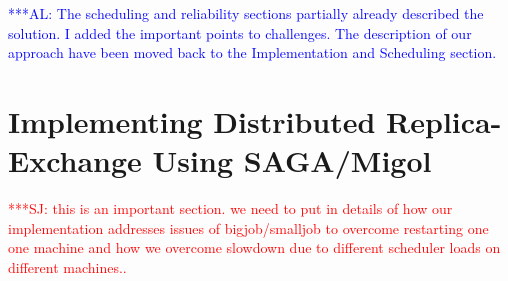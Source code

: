 \documentclass{rspublic}
\newcommand{\alnote}[1]{ {\textcolor{blue} { ***AL: #1 }}}
\newcommand{\jhanote}[1]{ {\textcolor{red} { ***SJ: #1 }}}
\newcommand{\alnote}[1]{}
\newcommand{\jhanote}[1]{}
\begin{document}
%                                   


\alnote{The scheduling and reliability sections partially already described the solution. 
I added the important points to challenges. The description of our approach have been 
moved back to the Implementation and Scheduling section.}
                         
\section{Implementing Distributed Replica-Exchange Using SAGA/Migol}

\jhanote{this is an important section. we need to put in details of
  how our implementation addresses issues of bigjob/smalljob to
  overcome restarting one one machine and how we overcome slowdown due
  to different scheduler loads on different machines..}

\end{document}

